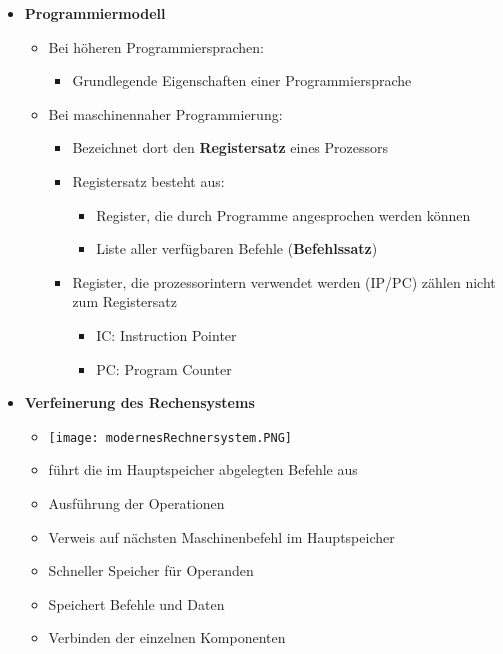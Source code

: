 \begin{itemize}
        \item \textbf{Programmiermodell}
            \begin{itemize}
                \item Bei höheren Programmiersprachen:
                    \begin{itemize}
                        \item Grundlegende Eigenschaften einer Programmiersprache 
                    \end{itemize} 
                \item Bei maschinennaher Programmierung:
                    \begin{itemize}
                        \item Bezeichnet dort den \textbf{Registersatz} eines Prozessors 
                        \item Registersatz besteht aus:
                            \begin{itemize}
                                \item Register, die durch Programme angesprochen werden können
                                \item Liste aller verfügbaren Befehle (\textbf{Befehlssatz})
                            \end{itemize}
                        \item Register, die prozessorintern verwendet werden (IP/PC) zählen nicht zum Registersatz
                            \begin{itemize}
                                \item IC: Instruction Pointer 
                                \item PC: Program Counter
                            \end{itemize}
                    \end{itemize}
            \end{itemize}

        \item \textbf{Verfeinerung des Rechensystems}
            \begin{itemize}
                \item[] \texttt{[image: modernesRechnersystem.PNG]}
                \item {} führt die im Hauptspeicher abgelegten Befehle aus 
                \item {} Ausführung der Operationen
                \item {} Verweis auf nächsten Maschinenbefehl im Hauptspeicher
                \item {} Schneller Speicher für Operanden
                \item {} Speichert Befehle und Daten 
                \item {} Verbinden der einzelnen Komponenten
            \end{itemize}

    \end{itemize}

